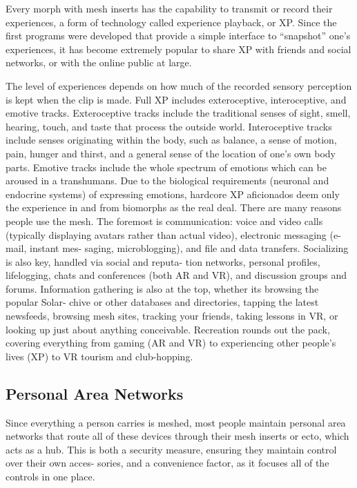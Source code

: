 Every morph with mesh inserts has the capability 
to transmit or record their experiences, a form of 
technology called experience playback, or XP. Since 
the first programs were developed that provide a 
simple interface to ``snapshot'' one's experiences, 
it has become extremely popular to share XP with 
friends and social networks, or with the online public 
at large.

The level of experiences depends on how much of 
the recorded sensory perception is kept when the clip 
is made. Full XP includes exteroceptive, interoceptive, 
and emotive tracks. Exteroceptive tracks include the 
traditional senses of sight, smell, hearing, touch, and 
taste that process the outside world. Interoceptive 
tracks include senses originating within the body, such 
as balance, a sense of motion, pain, hunger and thirst, 
and a general sense of the location of one's own body 
parts. Emotive tracks include the whole spectrum of 
emotions which can be aroused in a transhumans. 
Due to the biological requirements (neuronal and 
endocrine systems) of expressing emotions, hardcore 
XP aficionados deem only the experience in and from 
biomorphs as the real deal.
There are many reasons people use the mesh. The 
foremost is communication: voice and video calls 
(typically displaying avatars rather than actual 
video), electronic messaging (e-mail, instant mes-
saging, microblogging), and file and data transfers. 
Socializing is also key, handled via social and reputa-
tion networks, personal profiles, lifelogging, chats 
and conferences (both AR and VR), and discussion 
groups and forums. Information gathering is also 
at the top, whether its browsing the popular Solar-
chive or other databases and directories, tapping 
the latest newsfeeds, browsing mesh sites, tracking 
your friends, taking lessons in VR, or looking up just 
about anything conceivable. Recreation rounds out 
the pack, covering everything from gaming (AR and 
VR) to experiencing other people's lives (XP) to VR 
tourism and club-hopping.

\subsection{Personal Area Networks}

Since everything a person carries is meshed, most 
people maintain personal area networks that route 
all of these devices through their mesh inserts or ecto, 
which acts as a hub. This is both a security measure, 
ensuring they maintain control over their own acces-
sories, and a convenience factor, as it focuses all of the 
controls in one place.

